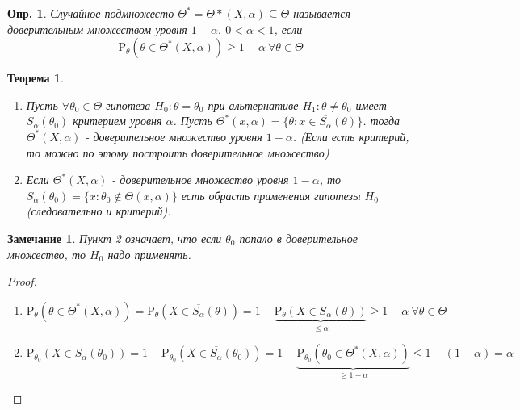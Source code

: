 \documentclass[12pt]{article}
\newtheorem{definition}{Опр.}
\newtheorem*{remark}{Замечание}
\theoremstyle{basic_theorem}
\newtheorem{theorem}{Теорема}
\theoremstyle{name_theorem}
\def\P{
    \mathrm{P}
}
\begin{document}
\begin{definition}
    Случайное подмножесто $\Theta^*=\Theta*(X,\alpha)\subseteq\Theta$
    называется доверительным множеством уровня $1-\alpha,\ 0<\alpha<1$,
    если
    $$\P_\theta(\theta\in\Theta^*(X,\alpha))\geq 1-\alpha\ \forall\theta\in\Theta$$
\end{definition}
\begin{theorem} \label{th::trusted_set_eq_plausibility_test}
    \begin{enumerate}
    \item Пусть $\forall\theta_0\in\Theta$ гипотеза $H_0:\theta=\theta_0$
    при альтернативе $H_1:\theta\neq\theta_0$ имеет $S_\alpha(\theta_0)$
    критерием уровня $\alpha$. Пусть $\Theta^*(x,\alpha) = \{\theta:x\in\overline{S_\alpha}(\theta)\}$.
    тогда $\Theta^*(X,\alpha)$ - доверительное множество уровня $1-\alpha$.
    (Если есть критерий, то можно по этому  построить доверительное множество)
    
        \item Если $\Theta^*(X,\alpha)$ - доверительное множество уровня $1-\alpha$,
    то $\overline{S_\alpha}(\theta_0)=\{x:\theta_0\notin\Theta(x,\alpha)\}$
    есть обрасть применения гипотезы $H_0$ (следовательно и критерий).
    \end{enumerate}
\end{theorem}
\begin{remark}
    Пункт 2 означает, что если $\theta_0$ попало в доверительное множество,
    то $H_0$ надо применять.
\end{remark}
\begin{proof}
    \begin{enumerate}
        \item $$\P_\theta(\theta\in\Theta^*(X,\alpha)) = \P_\theta(X\in\overline{S_\alpha}(\theta)) = 1 - \underbrace{\P_\theta(X\in S_\alpha(\theta))}_{\leq\alpha}\geq 1-\alpha\ \forall\theta\in\Theta$$
        \item $$\P_{\theta_0}(X\in S_\alpha(\theta_0)) = 1-\P_{\theta_0}(X\in \overline{S_\alpha}(\theta_0))=
        1-\underbrace{\P_{\theta_0}(\theta_0\in\Theta^*(X,\alpha))}_{\geq 1-\alpha} \leq 1-(1-\alpha) = \alpha$$
    \end{enumerate}
\end{proof}
\end{document}
